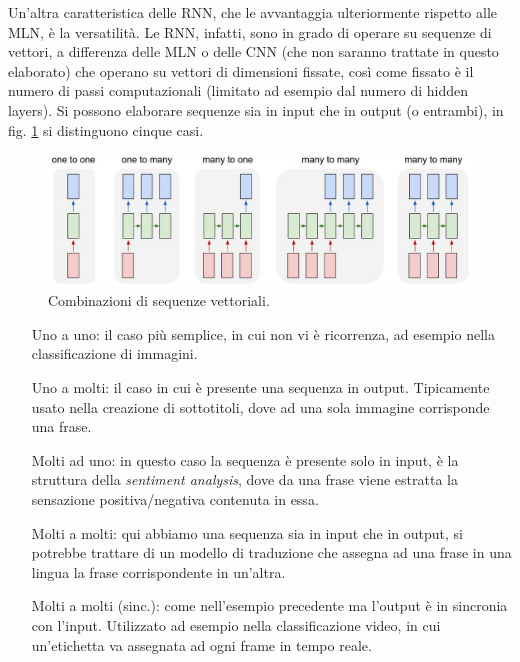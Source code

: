 Un'altra caratteristica delle RNN, che le avvantaggia ulteriormente rispetto alle MLN, è la versatilità. Le RNN, infatti, sono in grado di operare su sequenze di vettori, a differenza delle MLN o delle CNN (che non saranno trattate in questo elaborato) che operano su vettori di dimensioni fissate, così come fissato è il numero di passi computazionali (limitato ad esempio dal numero di hidden layers). Si possono elaborare sequenze sia in input che in output (o entrambi), in fig. \ref{fig:1.7} si distinguono cinque casi.
\newpage
\begin{figure}[ht]
	\centering
	\includegraphics{img/rnn_seq.jpg}
	\caption{Combinazioni di sequenze vettoriali. \cite{rnn_effect}}
	\label{fig:1.7}
\end{figure}

\begin{enumerate}
	\label{enum:recurrence}
	\item[Uno a uno:] il caso più semplice, in cui non vi è ricorrenza, ad esempio nella classificazione di immagini.
	\item[Uno a molti:] il caso in cui è presente una sequenza in output. Tipicamente usato nella creazione di sottotitoli, dove ad una sola immagine corrisponde una frase.
	\item[Molti ad uno:] in questo caso la sequenza è presente solo in input, è la struttura della \textit{sentiment analysis}, dove da una frase viene estratta la sensazione positiva/negativa contenuta in essa.
	\item[Molti a molti:] qui abbiamo una sequenza sia in input che in output, si potrebbe trattare di un modello di traduzione che assegna ad una frase in una lingua la frase corrispondente in un'altra.
	\item[Molti a molti (sinc.):] come nell'esempio precedente ma l'output è in sincronia con l'input. Utilizzato ad esempio nella classificazione video, in cui un'etichetta va assegnata ad ogni frame in tempo reale.
\end{enumerate}
